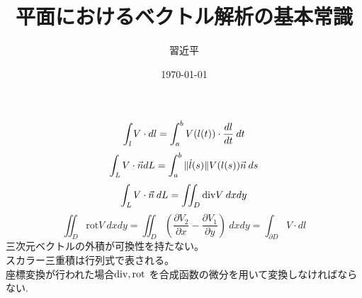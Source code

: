 \documentclass[dvipdfmx]{jarticle}
\theoremstyle{remark}
\theoremstyle{plain}
\begin{document}
\title{平面におけるベクトル解析の基本常識}
\author{習近平}
\date{\today}
\maketitle
$$
\int_{\it{l}} V \cdot dl = \int_a^b V(l(t)) \cdot \frac{dl}{dt} \: dt
$$
$$
\int_{\it{L}}V \cdot \vec{n} dL = \int_{a}^{b} {\| \dot{l}(s) \| V(l(s)) \vec{n}  } \: d{s}
$$
$$
\int_{\it{L}} V \cdot \vec{n} \: dL = \iint_D \mathrm{div}{V} \: dxdy
$$
$$
\iint_D \mathrm{rot} V \: dxdy =\iint_D \left( \frac{\partial V_2}{\partial x} - \frac{\partial V_1}{\partial y} \right) \: dxdy = \int_{\partial D} V \cdot dl
$$
三次元ベクトルの外積が可換性を持たない。\\
スカラー三重積は行列式で表される。\\
座標変換が行われた場合$\rm{div}, \rm{rot}$ を合成函数の微分を用いて変換しなければならない.
\end{document}

